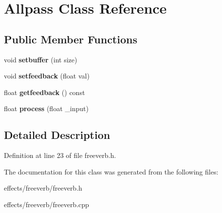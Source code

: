 \hypertarget{class_allpass}{}\section{Allpass Class Reference}
\label{class_allpass}
\subsection*{Public Member Functions}
\begin{DoxyCompactItemize}
\item 
\mbox{\label{class_allpass_a7c1d94e2a570f0e3194e18bf356b23ba}} 
void {\bfseries setbuffer} (int size)
\item 
\mbox{\label{class_allpass_a74cf1bfcf4074971f4d7812e05d343cd}} 
void {\bfseries setfeedback} (float val)
\item 
\mbox{\label{class_allpass_a45a0944019b0f8e3bc2dede781e45d93}} 
float {\bfseries getfeedback} () const
\item 
\mbox{\label{class_allpass_a0a993592a7f3563c007d0966e7a92643}} 
float {\bfseries process} (float \+\_\+input)
\end{DoxyCompactItemize}


\subsection{Detailed Description}


Definition at line 23 of file freeverb.\+h.



The documentation for this class was generated from the following files\+:\begin{DoxyCompactItemize}
\item 
effects/freeverb/freeverb.\+h\item 
effects/freeverb/freeverb.\+cpp\end{DoxyCompactItemize}
